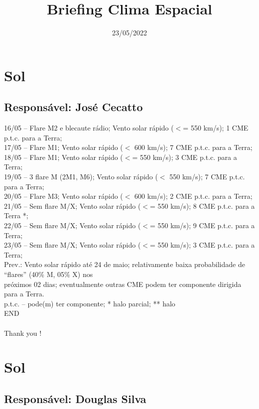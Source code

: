 \documentclass[a4paper, 10pt]{article}
\title{\Large{\textbf{Briefing Clima Espacial}}}
\date{23/05/2022}
\begin{document}
\maketitle 

  \thispagestyle{fancy} \section{Sol} 
 \subsection{Responsável: José Cecatto}

16/05 – Flare M2 e blecaute rádio; Vento solar rápido ($<$= 550 km/s); 1 CME p.t.c. para a Terra; \\ 17/05 – Flare M1; Vento solar rápido ($<$ 600 km/s); 7 CME p.t.c. para a Terra; \\ 18/05 – Flare M1; Vento solar rápido ($<$= 550 km/s); 3 CME p.t.c. para a Terra;  \\ 19/05 – 3 flare M (2M1, M6); Vento solar rápido ($<$ 550 km/s); 7 CME p.t.c. para a Terra;  \\ 20/05 – Flare M3; Vento solar rápido ($<$ 600 km/s); 2 CME p.t.c. para a Terra; \\ 21/05 – Sem flare M/X; Vento solar rápido ($<$= 550 km/s); 8 CME p.t.c. para a Terra *; \\ 22/05 – Sem flare M/X; Vento solar rápido ($<$= 550 km/s); 9 CME p.t.c. para a Terra; \\ 23/05 – Sem flare M/X; Vento solar rápido ($<$= 550 km/s); 3 CME p.t.c. para a Terra; \\ Prev.: Vento solar rápido até 24 de maio; relativamente baixa probabilidade de “flares” (40\% M, 05\% X) nos \\ próximos 02 dias; eventualmente outras CME podem ter componente dirigida para a Terra. \\ p.t.c. – pode(m) ter componente; * halo parcial; ** halo \\ END \\  \\ Thank you !\section{Sol} 
 \subsection{Responsável: Douglas Silva}
\end{document}

